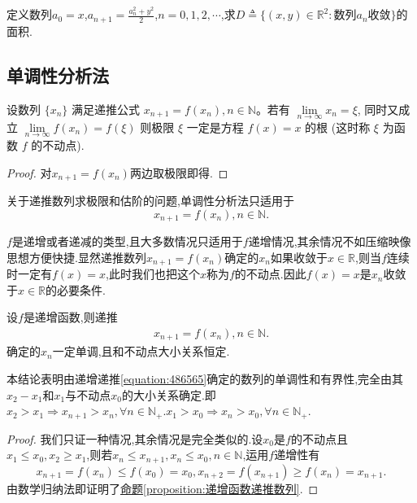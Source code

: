 \documentclass[../../main.tex]{subfiles}
\begin{document}
\begin{example}
定义数列\(a_0 = x\),\(a_{n + 1}=\frac{a_{n}^{2}+y^{2}}{2}\),\(n = 0,1,2,\cdots\),求\(D\triangleq\{(x,y)\in\mathbb{R}^2:\text{数列}a_n\text{收敛}\}\)的面积.
\end{example}
\begin{solution}


\end{solution}





\subsection{单调性分析法}

\begin{proposition}[不动点]\label{proposition:不动点}
设数列 \(\{x_n\}\) 满足递推公式 \(x_{n+1} = f(x_n), n \in \mathbb{N}\)。若有 \(\lim\limits_{n \to \infty} x_n = \xi\), 同时又成立 \(\lim\limits_{n \to \infty} f(x_n) = f(\xi)\) 则极限 \(\xi\) 一定是方程 \(f(x) = x\) 的根 (这时称 \(\xi\) 为函数 \(f\) 的不动点).
\end{proposition}
\begin{proof}
对$x_{n+1} = f(x_n)$两边取极限即得.

\end{proof}

关于递推数列求极限和估阶的问题,单调性分析法只适用于
\[
x_{n + 1} = f(x_n),n \in \mathbb{N}.
\]

\(f\)是递增或者递减的类型,且大多数情况只适用于\(f\)递增情况,其余情况不如压缩映像思想方便快捷.显然递推数列$x_{n + 1} = f(x_n)$确定的\(x_n\)如果收敛于\(x \in \mathbb{R}\),则当\(f\)连续时一定有\(f(x) = x\),此时我们也把这个\(x\)称为\(f\)的不动点.因此\(f(x) = x\)是\(x_n\)收敛于\(x \in \mathbb{R}\)的必要条件.



\begin{proposition}[递增函数递推数列]\label{proposition:递增函数递推数列}
设\(f\)是递增函数,则递推
\begin{align}\label{equation:486565}
x_{n + 1} = f(x_n),n \in \mathbb{N}.
\end{align}
确定的\(x_n\)一定单调,且和不动点大小关系恒定.
\end{proposition}
\begin{note}
本结论表明由递增递推\eqref{equation:486565}确定的数列的单调性和有界性,完全由其\(x_2 - x_1\)和\(x_1\)与不动点$x_0$的大小关系确定.即$x_2>x_1\Rightarrow x_{n+1}>x_n,\forall n\in \mathbb{N} _+.x_1>x_0\Rightarrow x_n>x_0,\forall n\in \mathbb{N} _+$.
\end{note}
\begin{proof}
我们只证一种情况,其余情况是完全类似的.设\(x_0\)是\(f\)的不动点且\(x_1\leqslant  x_0,x_2\geqslant  x_1\),则若\(x_n\leqslant  x_{n + 1},x_n\leqslant  x_0,n\in\mathbb{N}\),运用\(f\)递增性有
\[
x_{n + 1} = f(x_n)\leqslant  f(x_0) = x_0,x_{n + 2} = f(x_{n + 1})\geqslant  f(x_n) = x_{n + 1}.
\]
由数学归纳法即证明了\hyperref[proposition:递增函数递推数列]{命题\ref{proposition:递增函数递推数列}}.

\end{proof}
\end{document}
